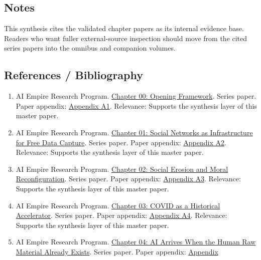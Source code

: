 \documentclass[
  american,
  11pt,
  letterpaper,
]{article}
\providecommand{\tightlist}{%
  \setlength{\itemsep}{0pt}\setlength{\parskip}{0pt}}
\begin{document}
\subsection{Notes}\label{notes}

This synthesis cites the validated chapter papers as its internal
evidence base. Readers who want fuller external-source inspection should
move from the cited series papers into the omnibus and companion
volumes.

\subsection{References / Bibliography}\label{references-bibliography}

\begin{enumerate}
\def\labelenumi{\arabic{enumi}.}
\tightlist
\item
  AI Empire Research Program.
  \href{00_opening-framework_paper.html}{Chapter 00: Opening Framework}.
  Series paper. Paper appendix:
  \hyperref[appendix-a1-chapter-00-opening-framework]{Appendix A1}.
  Relevance: Supports the synthesis layer of this master paper.
\item
  AI Empire Research Program.
  \href{01_social-networks-data-capture_paper.html}{Chapter 01: Social
  Networks as Infrastructure for Free Data Capture}. Series paper. Paper
  appendix:
  \hyperref[appendix-a2-chapter-01-social-networks-as-infrastructure-for-free-data-capture]{Appendix
  A2}. Relevance: Supports the synthesis layer of this master paper.
\item
  AI Empire Research Program.
  \href{02_social-erosion-and-moral-reconfiguration_paper.html}{Chapter
  02: Social Erosion and Moral Reconfiguration}. Series paper. Paper
  appendix:
  \hyperref[appendix-a3-chapter-02-social-erosion-and-moral-reconfiguration]{Appendix
  A3}. Relevance: Supports the synthesis layer of this master paper.
\item
  AI Empire Research Program.
  \href{03_covid-historical-accelerator_paper.html}{Chapter 03: COVID as
  a Historical Accelerator}. Series paper. Paper appendix:
  \hyperref[appendix-a4-chapter-03-covid-as-a-historical-accelerator]{Appendix
  A4}. Relevance: Supports the synthesis layer of this master paper.
\item
  AI Empire Research Program.
  \href{04_data-models-weights_paper.html}{Chapter 04: AI Arrives When
  the Human Raw Material Already Exists}. Series paper. Paper appendix:
  \hyperref[appendix-a5-chapter-04-ai-arrives-when-the-human-raw-material-already-exists]{Appendix
}
\end{enumerate}
\end{document}
